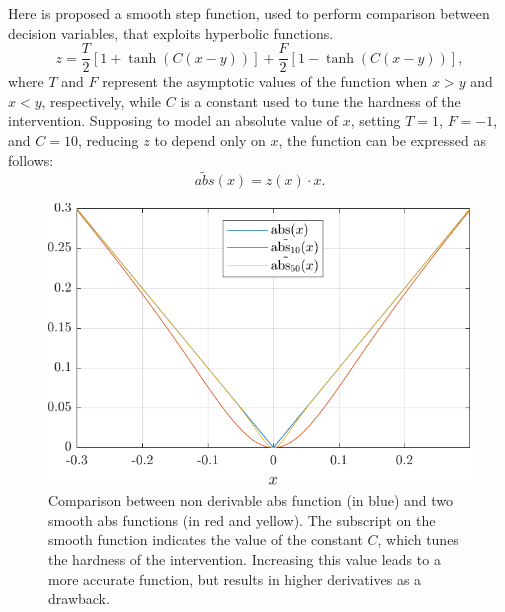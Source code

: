 		Here is proposed a smooth step function, used to perform comparison between decision variables, that exploits hyperbolic functions. 
		\begin{equation}\label{eq:ifelsesmooth}
			z = \frac{T}{2}\left[1 + \tanh(C\left(x-y\right))\right] + \frac{F}{2}\left[1 - \tanh(C\left(x-y\right))\right],
		\end{equation}
		where $T$ and $F$ represent the asymptotic values of the function when $x>y$ and $x<y$, respectively, while $C$ is a constant used to tune the hardness of the intervention. 
		Supposing to model an absolute value of $x$, setting $T=1$, $F=-1$, and $C=10$, reducing $z$ to depend only on $x$, the function can be expressed as follows:
		\begin{equation}
			\tilde{abs}(x) = z(x)\cdot x.
		\end{equation}
		
		\begin{figure}[h]
			\centering
			\includegraphics[scale = .8]{Images/Appendices/abs_smooth.pdf}
			\caption{Comparison between non derivable abs function (in blue) and two smooth abs functions (in red and yellow). The subscript on the smooth function indicates the value of the constant $C$, which tunes the hardness of the intervention. Increasing this value leads to a more accurate function, but results in higher derivatives as a drawback.}
			\label{fig:abs_smooth}
		\end{figure}